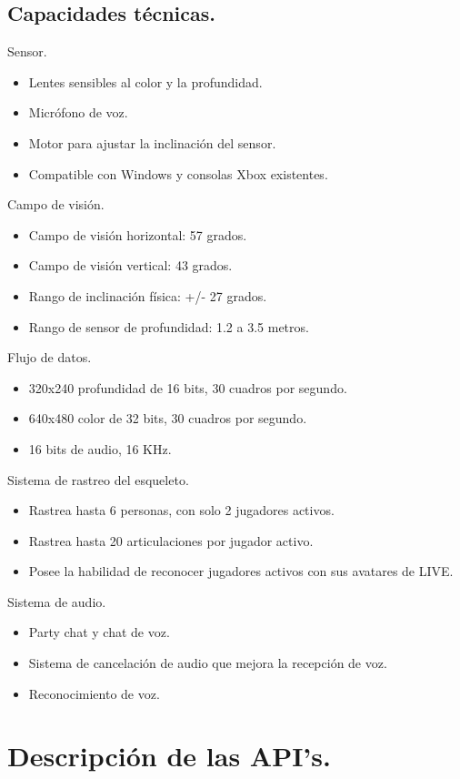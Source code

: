 \documentclass[11pt,a4paper]{article}
\begin{document}
\subsection{Capacidades técnicas.}
Sensor.
\begin{itemize} %
\item Lentes sensibles al color y la profundidad.
\item Micrófono de voz.
\item Motor para ajustar la inclinación del sensor.
\item Compatible con Windows y consolas Xbox existentes.
\end{itemize}
Campo de visión.
\begin{itemize} 
\item Campo de visión horizontal: 57 grados.
\item Campo de visión vertical: 43 grados.
\item Rango de inclinación física: +/- 27 grados.
\item Rango de sensor de profundidad:  1.2 a 3.5 metros.
\end{itemize}
Flujo de datos. 
\begin{itemize} 
\item 320x240  profundidad de 16 bits, 30 cuadros por segundo.
\item 640x480 color de 32 bits, 30 cuadros por segundo.
\item 16 bits de audio, 16 KHz.
\end{itemize}
Sistema de rastreo del esqueleto.
\begin{itemize} 
\item Rastrea hasta 6 personas, con solo 2 jugadores activos.
\item Rastrea hasta 20 articulaciones por jugador activo.
\item Posee la habilidad de reconocer jugadores activos con sus avatares de LIVE.
\end{itemize}
Sistema de audio.
\begin{itemize} 
\item Party chat y chat de voz.
\item Sistema de cancelación de audio que mejora la recepción de voz.
\item Reconocimiento de voz.
\end{itemize}

\section{Descripción de las API's.}
\end{document}
